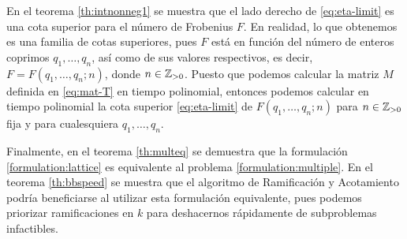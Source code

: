 En el teorema \ref{th:intnonneg1} se muestra que el lado derecho de \eqref{eq:eta-limit} es una cota
superior para el número de Frobenius $F$. En realidad, lo que obtenemos es una familia de cotas
superiores, pues $F$ está en función del número de enteros coprimos $q_1, \ldots, q_n$, así como de
sus valores respectivos, es decir, $F = F(q_1, \ldots, q_n; n)$, donde $n \in \mathbb{Z}_{> 0}$. Puesto que
podemos calcular la matriz $M$ definida en \eqref{eq:mat-T} en tiempo polinomial, entonces podemos
calcular en tiempo polinomial la cota superior \eqref{eq:eta-limit} de $F(q_1, \ldots, q_n; n)$ para
$n \in \mathbb{Z}_{> 0}$ fija y para cualesquiera $q_1, \ldots, q_n$.

Finalmente, en el teorema \ref{th:multeq} se demuestra que la formulación \eqref{formulation:lattice} es
equivalente al problema \eqref{formulation:multiple}.
En el teorema \ref{th:bbspeed} se muestra que el algoritmo de Ramificación y Acotamiento podría
beneficiarse al utilizar esta formulación equivalente, pues podemos priorizar ramificaciones en $k$
para deshacernos rápidamente de subproblemas infactibles.

